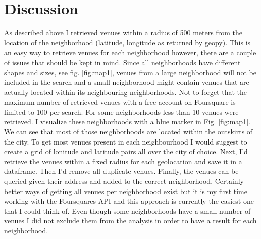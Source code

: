 \documentclass[a4paper,12pt,english]{article}
\begin{document}
\section{Discussion}
As described above I retrieved venues within a radius of 500 meters from the location of the neighborhood (latitude, longitude as returned by geopy). This is an easy way to retrieve venues for each neighborhood however, there are a couple of issues that should be kept in mind. Since all neighborhoods have different shapes and sizes, see fig. \ref{fig:map1}, venues from a large neighborhood will not be included in the search and a small neighborhood might contain venues that are actually located within its neighbouring neighborhoods. Not to forget that the maximum number of retrieved venues with a free account on Foursquare is limited to 100 per search. For some neighborhoods less than 10 venues were retrieved. I visualize these neighborhoods with a blue marker in Fig. \ref{fig:map1}. We can see that most of those neighborhoods are located within the outskirts of the city. To get most venues present in each neighbourhood I would suggest to create a grid of lonitude and latitude pairs all over the city of choice. Next, I'd retrieve the venues within a fixed radius for each geolocation and save it in a dataframe. Then I'd remove all duplicate venues. Finally, the venues can be queried given their address and added to the correct neighborhood. Certainly better ways of getting all venues per neighborhood exist but it is my first time working with the Foursquares API and this approach is currently the easiest one that I could think of. Even though some neighborhoods have a small number of venues I did not exclude them from the analysis in order to have a result for each neighborhood.\par
\end{document}
